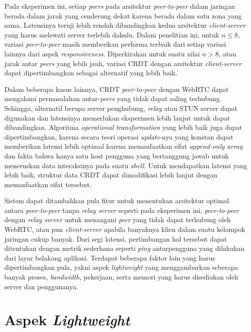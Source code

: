 Pada eksperimen ini, setiap \textit{peers} pada arsitektur \textit{peer-to-peer} dalam jaringan berada dalam jarak yang cenderung dekat karena berada dalam satu zona yang sama. Latensinya teruji lebih rendah dibandingkan kedua arsitektur \textit{client-server} yang harus melewati server terlebih dahulu. Dalam penelitian ini, untuk $n \leq 8$, variasi \textit{peer-to-peer} masih memberikan performa terbaik dari setiap variasi lainnya dari aspek \textit{responsiveness}. Diperkirakan untuk suatu nilai $n > 8$, atau jarak antar \textit{peers} yang lebih jauh, variasi CRDT dengan arsitektur \textit{client-server} dapat dipertimbangkan sebagai alternatif yang lebih baik.

Dalam beberapa kasus lainnya, CRDT \textit{peer-to-peer} dengan WebRTC dapat mengalami permasalahan antar-\textit{peers} yang tidak dapat saling terhubung. Sehingga, alternatif berupa server penghubung, \textit{relay} atau STUN server dapat digunakan dan latensinya memerlukan eksperimen lebih lanjut untuk dapat dibandingkan. Algoritma \textit{operational transformation} yang lebih baik juga dapat dipertimbangkan, karena secara teori operasi \textit{update}-nya yang konstan dapat memberikan latensi lebih optimal karena memanfaatkan sifat \textit{append-only array} dan fakta bahwa hanya satu host pengguna yang bertanggung jawab untuk meneruskan data interaksinya pada suatu \textit{shell}. Untuk mendapatkan latensi yang lebih baik, struktur data CRDT dapat dimodifikasi lebih lanjut dengan memanfaatkan sifat tersebut.

Sistem dapat ditambahkan pula fitur untuk menentukan arsitektur optimal antara \textit{peer-to-peer} tanpa \textit{relay server} seperti pada eksperimen ini, \textit{peer-to-peer} dengan \textit{relay server} untuk menangani \textit{peer} yang tidak dapat terhubung oleh WebRTC, atau pun \textit{client-server} apabila banyaknya klien dalam suatu kelompok jaringan cukup banyak. Dari segi latensi, pertimbangan hal tersebut dapat ditentukan dengan metrik sederhana seperti \textit{ping} antarpengguna yang dilakukan dari layar belakang aplikasi. Terdapat beberapa faktor lain yang harus dipertimbangkan pula, yakni aspek \textit{lightweight} yang menggambarkan seberapa banyak proses, \textit{bandwidth}, pekerjaan, serta memori yang harus disediakan oleh server dan penggunanya.

\section{Aspek \textit{Lightweight}}

